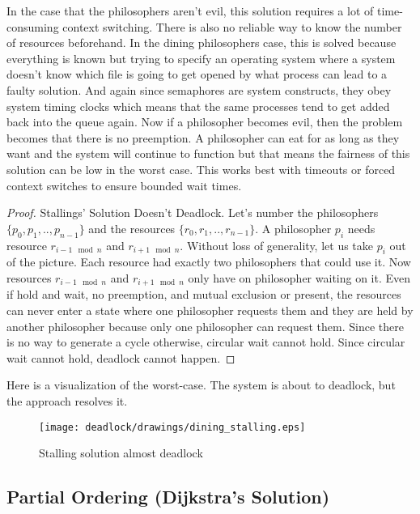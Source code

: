 In the case that the philosophers aren't evil, this solution requires a lot of time-consuming context switching.
There is also no reliable way to know the number of resources beforehand.
In the dining philosophers case, this is solved because everything is known but trying to specify an operating system where a system doesn't know which file is going to get opened by what process can lead to a faulty solution.
And again since semaphores are system constructs, they obey system timing clocks which means that the same processes tend to get added back into the queue again.
Now if a philosopher becomes evil, then the problem becomes that there is no preemption.
A philosopher can eat for as long as they want and the system will continue to function but that means the fairness of this solution can be low in the worst case.
This works best with timeouts or forced context switches to ensure bounded wait times.

\begin{proof} Stallings' Solution Doesn't Deadlock.
  Let's number the philosophers $\{p_0, p_1, .., p_{n-1}\}$ and the resources $\{r_0, r_1, .., r_{n-1}\}$.
  A philosopher $p_i$ needs resource $r_{i-1 \mod n}$ and $r_{i + 1 \mod n}$.
  Without loss of generality, let us take $p_i$ out of the picture.
  Each resource had exactly two philosophers that could use it.
  Now resources $r_{i-1 \mod n}$ and $r_{i + 1 \mod n}$ only have on philosopher waiting on it.
  Even if hold and wait, no preemption, and mutual exclusion or present, the resources can never enter a state where one philosopher requests them and they are held by another philosopher because only one philosopher can request them.
  Since there is no way to generate a cycle otherwise, circular wait cannot hold.
  Since circular wait cannot hold, deadlock cannot happen.
\end{proof}

Here is a visualization of the worst-case.
The system is about to deadlock, but the approach resolves it.

\begin{figure}[H]
\centering
\texttt{[image: deadlock/drawings/dining\_stalling.eps]}
\caption{Stalling solution almost deadlock}
\end{figure}


\subsection{Partial Ordering (Dijkstra's Solution)}

